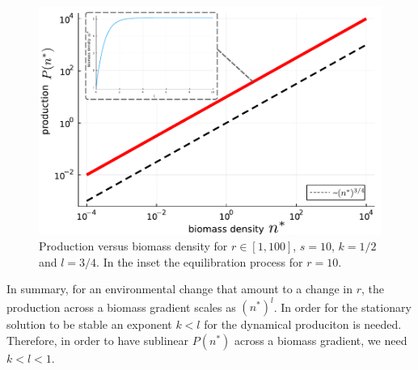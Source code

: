 \documentclass[10pt]{article}
\begin{document}
\begin{figure}[h!]
    \centering
    \includegraphics[width=.8\textwidth]{fig/single-pop.pdf}
    \caption{Production versus biomass density for $r\in[1,100]$,
    $s=10$, $k=1/2$ and $l=3/4$. In the inset the equilibration process
    for $r=10$.}
    \label{fig. example}
\end{figure}

In summary, for an environmental change that amount to a change in $r$, 
the production across a biomass gradient 
scales as $(n^*)^l$. In order for
the stationary solution to be stable an exponent $k<l$
for the dynamical produciton is needed.
Therefore, in order to have sublinear $P(n^*)$ across a biomass gradient,
we need $k<l<1$.


\newpage




\end{document}
